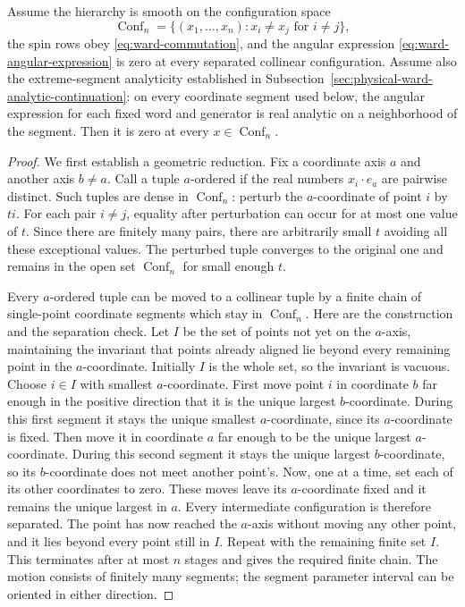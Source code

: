 \begin{theorem}\label{thm:ward-global-propagation}
Assume the hierarchy is smooth on the configuration space
\[
 \operatorname{Conf}_n=\{(x_1,\ldots,x_n):x_i\ne x_j\text{ for }i\ne j\},
\]
the spin rows obey \eqref{eq:ward-commutation}, and the angular expression
\eqref{eq:ward-angular-expression} is zero at every separated collinear
configuration.  Assume also the extreme-segment analyticity established in
Subsection~\ref{sec:physical-ward-analytic-continuation}: on every coordinate
segment used below, the angular expression for each fixed word and generator
is real analytic on a neighborhood of the segment.  Then it is zero at every
$x\in\operatorname{Conf}_n$.
\end{theorem}

\begin{proof}
We first establish a geometric reduction.  Fix a coordinate axis $a$ and
another axis $b\ne a$.  Call a tuple $a$-ordered if the real numbers
$x_i\cdot e_a$ are pairwise distinct.  Such tuples are dense in
$\operatorname{Conf}_n$: perturb the $a$-coordinate of point $i$ by
$t i$.  For each pair $i\ne j$, equality after perturbation can occur for at
most one value of $t$.  Since there are finitely many pairs, there are
arbitrarily small $t$ avoiding all these exceptional values.  The perturbed
tuple converges to the original one and remains in the open set
$\operatorname{Conf}_n$ for small enough $t$.

Every $a$-ordered tuple can be moved to a collinear tuple by a finite chain
of single-point coordinate segments which stay in $\operatorname{Conf}_n$.
Here are the construction and the separation check.  Let $I$ be the set of
points not yet on the $a$-axis, maintaining the invariant that points
already aligned lie beyond every remaining point in the $a$-coordinate.
Initially $I$ is the whole set, so the invariant is vacuous.  Choose
$i\in I$ with smallest $a$-coordinate.  First move point $i$ in coordinate $b$ far enough in the
positive direction that it is the unique largest $b$-coordinate.  During
this first segment it stays the unique smallest $a$-coordinate, since its
$a$-coordinate is fixed.  Then move it in coordinate $a$ far enough to be
the unique largest $a$-coordinate.  During this second segment it stays
the unique largest $b$-coordinate, so its $b$-coordinate does not meet
another point's.  Now, one at a time, set each of its other coordinates
to zero.  These moves leave its $a$-coordinate fixed and it remains the
unique largest in $a$.  Every intermediate configuration is therefore
separated.  The point has now reached the $a$-axis without moving any other
point, and it lies beyond every point still in $I$.  Repeat with the
remaining finite set $I$.  This terminates after at most $n$ stages and
gives the required finite chain.  The motion consists of finitely many
segments; the segment parameter interval can be oriented in either direction.


\end{proof}
